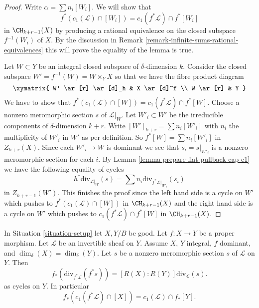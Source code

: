 \begin{proof}
Write $\alpha = \sum n_i[W_i]$. We will show that
$$
f^*(c_1(\mathcal{L}) \cap [W_i]) = c_1(f^*\mathcal{L}) \cap f^*[W_i]
$$
in $\CH_{k + r - 1}(X)$ by producing a rational equivalence
on the closed subspace $f^{-1}(W_i)$ of $X$.
By the discussion in
Remark \ref{remark-infinite-sums-rational-equivalences}
this will prove the equality of the lemma is true.

\medskip\noindent
Let $W \subset Y$ be an integral closed subspace of $\delta$-dimension $k$.
Consider the closed subspace $W' = f^{-1}(W) = W \times_Y X$
so that we have the fibre product diagram
$$
\xymatrix{
W' \ar[r] \ar[d]_h & X \ar[d]^f \\
W \ar[r] & Y
}
$$
We have to show that
$f^*(c_1(\mathcal{L}) \cap [W]) = c_1(f^*\mathcal{L}) \cap f^*[W]$.
Choose a nonzero meromorphic section $s$ of $\mathcal{L}|_W$.
Let $W'_i \subset W'$ be the irreducible components of
$\delta$-dimension $k + r$. Write $[W']_{k + r} = \sum n_i[W'_i]$
with $n_i$ the multiplicity of $W'_i$ in $W'$ as per definition.
So $f^*[W] = \sum n_i[W'_i]$ in $Z_{k + r}(X)$.
Since each $W'_i \to W$ is dominant we
see that $s_i = s|_{W'_i}$ is a nonzero meromorphic section for
each $i$. By Lemma \ref{lemma-prepare-flat-pullback-cap-c1}
we have the following equality of cycles
$$
h^*\text{div}_{\mathcal{L}|_W}(s) =
\sum n_i\text{div}_{f^*\mathcal{L}|_{W'_i}}(s_i)
$$
in $Z_{k + r - 1}(W')$. This finishes the proof since
the left hand side is a cycle on $W'$ which pushes to
$f^*(c_1(\mathcal{L}) \cap [W])$ in $\CH_{k + r - 1}(X)$
and the right hand side is a cycle on $W'$ which pushes to
$c_1(f^*\mathcal{L}) \cap f^*[W]$ in $\CH_{k + r - 1}(X)$.
\end{proof}

\begin{lemma}
\label{lemma-equal-c1-as-cycles}
In Situation \ref{situation-setup} let $X, Y/B$ be good.
Let $f : X \to Y$ be a proper morphism.
Let $\mathcal{L}$ be an invertible sheaf on $Y$.
Assume $X$, $Y$ integral, $f$ dominant, and $\dim_\delta(X) = \dim_\delta(Y)$.
Let $s$ be a nonzero meromorphic section $s$ of $\mathcal{L}$ on $Y$.
Then
$$
f_*\left(\text{div}_{f^*\mathcal{L}}(f^*s)\right) =
[R(X) : R(Y)]\text{div}_\mathcal{L}(s).
$$
as cycles on $Y$. In particular
$$
f_*(c_1(f^*\mathcal{L}) \cap [X]) = c_1(\mathcal{L}) \cap f_*[Y].
$$
\end{lemma}

